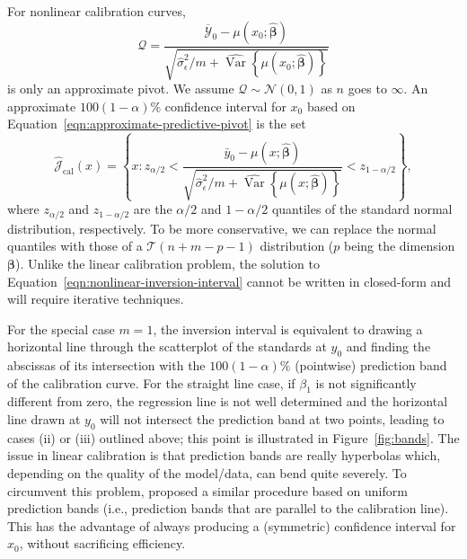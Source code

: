 \documentclass[cmfont,usenames,dvipsnames,leqno]{afit-etd}\usepackage[]{graphicx}\usepackage[]{color}
\newcommand{\mc}[1]{\ensuremath{\mathcal{#1}}}
\newcommand{\wh}[1]{\ensuremath{\widehat{#1}}}
\newcommand{\wb}[1]{\ensuremath{\overline{#1}}}
\newcommand{\var}{\operatorname{Var}}
\begin{document}
For nonlinear calibration curves, 
\begin{equation}
\label{eqn:approximate-predictive-pivot}
  \mc{Q} = \frac{\wb{\mc{Y}}_0 - \mu\left(x_0; \wh{\bm{\beta}}\right)}{\sqrt{\wh{\sigma}_\epsilon^2/m + \wh{\var}\left\{\mu\left(x_0; \wh{\bm{\beta}}\right)\right\}}}
\end{equation}
is only an approximate pivot. We assume $\mc{Q} \sim \mc{N}(0, 1)$ as $n$ goes to $\infty$. An approximate $100(1 - \alpha)\%$ confidence interval for $x_0$ based on Equation~\eqref{eqn:approximate-predictive-pivot} is the set 
\begin{equation}
\label{eqn:nonlinear-inversion-interval}
  \wh{\mc{J}}_\mathrm{cal}(x) = \left\{x: z_{\alpha/2} < \frac{\bar{y}_0 - \mu\left(x; \wh{\bm{\beta}}\right)}{\sqrt{\wh{\sigma}_\epsilon^2/m + \wh{\var}\left\{\mu\left(x; \wh{\bm{\beta}}\right)\right\}}} < z_{1-\alpha/2} \right\},
\end{equation}
where $z_{\alpha/2}$ and $z_{1-\alpha/2}$ are the $\alpha/2$ and $1-\alpha/2$ quantiles of the standard normal distribution, respectively. To be more conservative, we can replace the normal quantiles with those of a $\mathcal{T}\left(n+m-p-1\right)$ distribution ($p$ being the dimension $\bm{\beta}$). Unlike the linear calibration problem, the solution to Equation~\eqref{eqn:nonlinear-inversion-interval} cannot be written in closed-form and will require iterative techniques. 

For the special case $m = 1$, the inversion interval is equivalent to drawing a horizontal line through the scatterplot of the standards at $y_0$ and finding the abscissas of its intersection with the $100(1-\alpha)\%$ (pointwise) prediction band of the calibration curve. For the straight line case, if $\beta_1$ is not significantly different from zero, the regression line is not well determined and the horizontal line drawn at $y_0$ will not intersect the prediction band at two points, leading to cases (ii) or (iii) outlined above; this point is illustrated in Figure~\ref{fig:bands}. The issue in linear calibration is that prediction bands are really hyperbolas which, depending on the quality of the model/data, can bend quite severely. To circumvent this problem, \citet{trout_regular_1979} proposed a similar procedure based on uniform prediction bands (i.e., prediction bands that are parallel to the calibration line). This has the advantage of always producing a (symmetric) confidence interval for $x_0$, without sacrificing efficiency. 
\end{document}
